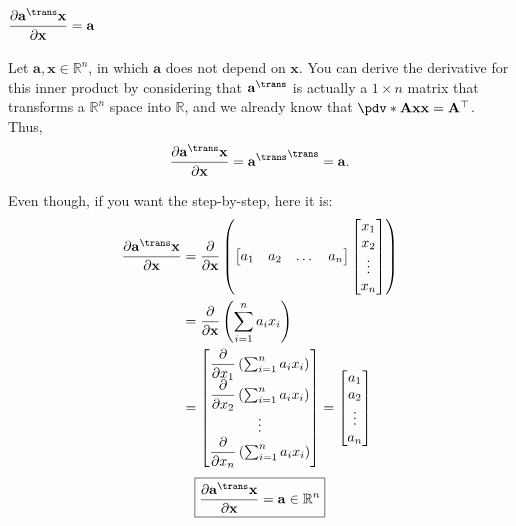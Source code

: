 \subsection{\(\dfrac{\partial \mathbf{a}^\trans \mathbf{x}}{\partial \mathbf{x}} = \mathbf{a}\)}

Let \(\mathbf{a, x} \in \mathbb{R}^{n}\), in which \(\mathbf{a}\) does not depend on \(\mathbf{x}\). You can derive the derivative for this inner product by considering that \(\mathbf{a}^\trans\) is actually a \(1\times n\) matrix that transforms a \(\mathbb{R}^{n}\) space into \(\mathbb{R}\), and we already know that \(\pdv*{\mathbf{Ax}}{\mathbf{x}} = \mathbf{A}^\top\). Thus,
\begin{align}
    \dfrac{\partial \mathbf{a}^\trans \mathbf{x}}{\partial \mathbf{x}} = {\mathbf{a}^\trans}^\trans = \mathbf{a}.
\end{align}

Even though, if you want the step-by-step, here it is:
\begin{align}
    \dfrac{\partial \mathbf{a}^\trans \mathbf{x}}{\partial \mathbf{x}} &= \dfrac{\partial}{\partial \mathbf{x}} \left(
    \begin{bmatrix}
        a_1 & a_2 & \dots & a_n
    \end{bmatrix} \begin{bmatrix}
        x_{1} \\ x_{2} \\ \vdots \\ x_{n}
    \end{bmatrix} \right) \\
    & = \dfrac{\partial}{\partial \mathbf{x}} \left( \sum_{i = 1}^n a_ix_i \right) \\
    & = \begin{bmatrix}
        \dfrac{\partial}{\partial x_1} \left( \sum_{i = 1}^n a_ix_i \right) \\ \dfrac{\partial}{\partial x_2} \left( \sum_{i = 1}^n a_ix_i \right) \\ \vdots \\ \dfrac{\partial}{\partial x_n} \left( \sum_{i = 1}^n a_ix_i \right) 
    \end{bmatrix} = \begin{bmatrix}
        a_1 \\ a_2 \\ \vdots \\ a_n
    \end{bmatrix}
\end{align}
\begin{align}
    \boxed{\dfrac{\partial \mathbf{a}^\trans \mathbf{x}}{\partial \mathbf{x}} = \mathbf{a} \in \mathbb{R}^{n}}
\end{align}

